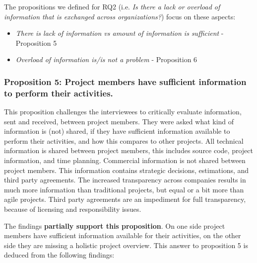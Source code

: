 The propositions we defined for  
RQ2 (i.e. {\em Is there a lack or overload of information that is exchanged across organizations?}) focus on these aspects:

\begin{itemize}
\item {\em There is lack of information vs amount of information is sufficient} - Proposition 5 %
\item {\em Overload of information is/is not a problem} - Proposition 6
\end{itemize}

\vspace{.2cm}
\subsubsection{Proposition 5: Project members have sufficient information to perform their activities.}

%
%
%

This proposition challenges the interviewees to critically evaluate information, sent and received, between project members. They were asked what kind of information is (not) shared, if they have sufficient information available to perform their activities, and how this compares to other projects. All technical information is shared between project members, this includes source code, project information, and time planning. Commercial information is not shared between project members. This information contains strategic decisions, estimations, and third party agreements. The increased transparency across companies results in much more information than traditional projects, but equal or a bit more than agile projects. Third party agreements are an impediment for full transparency, because of licensing and responsibility issues.

The findings {\bf partially support this proposition}. On one side project members have sufficient information available for their activities, on the other side they are missing a holistic project overview. This answer to proposition 5 is deduced from the following findings:


